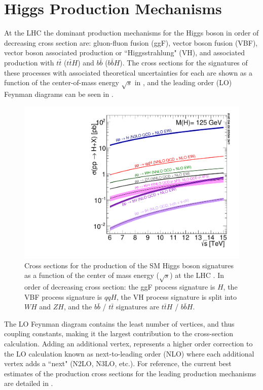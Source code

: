 \section{Higgs Production Mechanisms} \label{sec:higgs:production}

At the LHC the dominant production mechanisms for the Higgs boson in order of
decreasing cross section are: gluon-fluon fusion (ggF), vector boson fusion
(VBF), vector boson associated production or ``Higgsstrahlung" (VH), and
associated production with $t\bar{t}$ ($t\bar{t}H$) and $b\bar{b}$
($b\bar{b}H$).  The cross sections for the signatures of these processes with
associated theoretical uncertainties for each are shown as a function of the
center-of-mass energy $\sqrt{s}$ in , and the
leading order (LO) Feynman diagrams can be seen in .

\begin{figure}[!htbp]
  \begin{center}
    \includegraphics[width=0.5\linewidth]{figures/higgs/higgs_xsection.pdf}
    \caption{Cross sections for the production of the SM Higgs boson signatures
as a function of the center of mass energy ($\sqrt{s}$) at the LHC
\cite{PDG2018:Ch11}.  In order of decreasing cross section: the ggF process
signature is $H$, the VBF process signature is $qqH$, the VH process signature
is split into $WH$ and $ZH$, and the $b\bar{b}$ / $t\bar{t}$ signatures are
$t\bar{t}H$ / $b\bar{b}H$.}
    \label{fig:higgs_xsection}
  \end{center}
\end{figure}

The LO Feynman diagram contains the least number of vertices, and thus coupling
constants, making it the largest contribution to the cross-section calculation.
Adding an additional vertex, represents a higher order correction to the LO
calculation known as next-to-leading order (NLO) where each additional vertex
adds a ``next" (N2LO, N3LO, etc.). For reference, the current best
estimates of the production cross sections for the leading production
mechanisms are detailed in .

